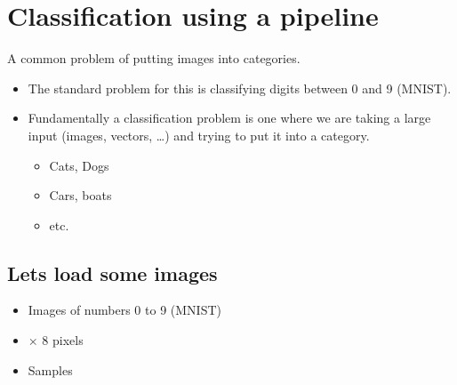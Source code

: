 \documentclass[letterpaper,10pt,english]{sphinxmanual}
\begin{document}
\chapter{Classification using a pipeline}
\label{\detokenize{05-SupervisedSegmentation:classification-using-a-pipeline}}
\sphinxAtStartPar
A common problem of putting images into categories.
\begin{itemize}
\item {} 
\sphinxAtStartPar
The standard problem for this is classifying digits between 0 and 9 (MNIST).

\item {} 
\sphinxAtStartPar
Fundamentally a classification problem is one where we are taking a large input (images, vectors, …) and trying to put it into a category.
\begin{itemize}
\item {} 
\sphinxAtStartPar
Cats, Dogs

\item {} 
\sphinxAtStartPar
Cars, boats

\item {} 
\sphinxAtStartPar
etc.

\end{itemize}

\end{itemize}


\section{Lets load some images}
\label{\detokenize{05-SupervisedSegmentation:lets-load-some-images}}\begin{itemize}
\item {} 
\sphinxAtStartPar
Images of numbers 0 to 9 (MNIST)

\item {} 
 \(\times\) 8 pixels

\item {} 
 Samples

\end{itemize}
\end{document}
